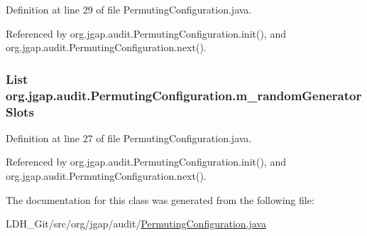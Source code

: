 Definition at line 29 of file Permuting\-Configuration.\-java.



Referenced by org.\-jgap.\-audit.\-Permuting\-Configuration.\-init(), and org.\-jgap.\-audit.\-Permuting\-Configuration.\-next().

\hypertarget{classorg_1_1jgap_1_1audit_1_1_permuting_configuration_af872b4a0ca5e224f9cd5df0562ff4a24}{
\subsubsection[{m\-\_\-random\-Generator\-Slots}]{\setlength{\rightskip}{0pt plus 5cm}List org.\-jgap.\-audit.\-Permuting\-Configuration.\-m\-\_\-random\-Generator\-Slots\hspace{0.3cm}{\ttfamily [private]}}}\label{classorg_1_1jgap_1_1audit_1_1_permuting_configuration_af872b4a0ca5e224f9cd5df0562ff4a24}


Definition at line 27 of file Permuting\-Configuration.\-java.



Referenced by org.\-jgap.\-audit.\-Permuting\-Configuration.\-init(), and org.\-jgap.\-audit.\-Permuting\-Configuration.\-next().



The documentation for this class was generated from the following file\-:\begin{DoxyCompactItemize}
\item 
L\-D\-H\-\_\-\-Git/src/org/jgap/audit/\hyperlink{_permuting_configuration_8java}{Permuting\-Configuration.\-java}\end{DoxyCompactItemize}

